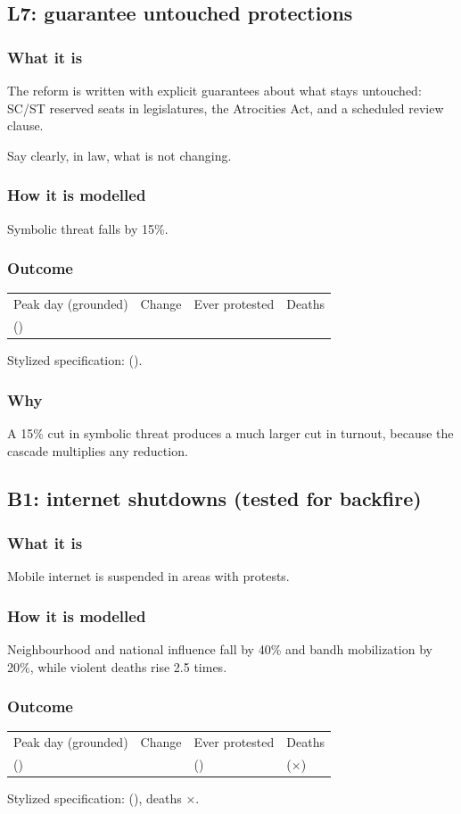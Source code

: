 \documentclass[11pt,a4paper]{article}
\makeatletter
\newcommand{\outcomeline}[6]{%
  \begin{tabular}{@{}llll@{}}
  \sffamily\small\color{muted}Peak day (grounded) & \sffamily\small\color{muted}Change & \sffamily\small\color{muted}Ever protested & \sffamily\small\color{muted}Deaths\\
  \textbf{#1} \small(#2) & \textbf{#3} & #4 & #5\\
  \end{tabular}\par\smallskip
  {\small\color{muted}Stylized specification: #6}\par}
\makeatother
\begin{document}
\subsection{L7: guarantee untouched protections}
\subsubsection{What it is}
The reform is written with explicit guarantees about what stays untouched: SC/ST reserved seats in legislatures, the Atrocities Act, and a scheduled review clause.
\begin{plainwords}Say clearly, in law, what is not changing.\end{plainwords}
\subsubsection{How it is modelled}
Symbolic threat falls by 15\%.
\subsubsection{Outcome}
\outcomeline{\PeakGroundedCredibleGuarantees}{\PeakRangeGroundedCredibleGuarantees}{\PeakChangeGroundedCredibleGuarantees}{\CumulativeGroundedCredibleGuarantees}{\DeathsGroundedCredibleGuarantees}{\PeakCentralCredibleGuarantees{} (\PeakChangeCentralCredibleGuarantees).}
\subsubsection{Why}
A 15\% cut in symbolic threat produces a much larger cut in turnout, because the cascade multiplies any reduction.

\subsection{B1: internet shutdowns (tested for backfire)}
\subsubsection{What it is}
Mobile internet is suspended in areas with protests.
\subsubsection{How it is modelled}
Neighbourhood and national influence fall by 40\% and bandh mobilization by 20\%, while violent deaths rise 2.5 times.
\subsubsection{Outcome}
\outcomeline{\PeakGroundedInternetShutdown}{\PeakRangeGroundedInternetShutdown}{\PeakChangeGroundedInternetShutdown}{\CumulativeGroundedInternetShutdown{} (\CumulativeChangeGroundedInternetShutdown)}{\DeathsGroundedInternetShutdown{} (×\DeathRatioGroundedInternetShutdown)}{\PeakCentralInternetShutdown{} (\PeakChangeCentralInternetShutdown), deaths ×\DeathRatioCentralInternetShutdown.}
\end{document}
